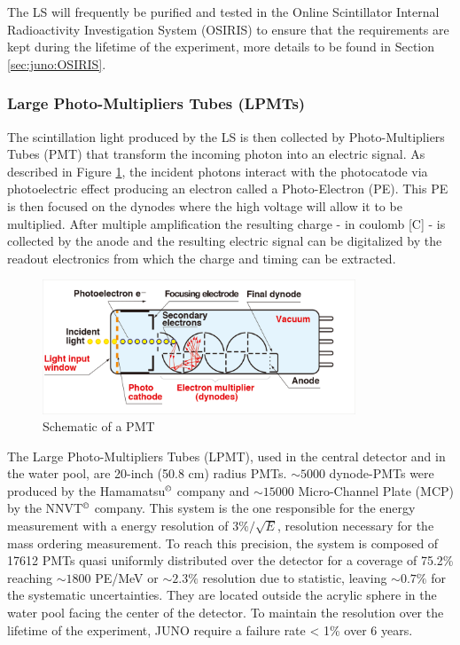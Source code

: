 \documentclass[../main.tex]{subfiles}
\begin{document}
The LS will frequently be purified and tested in the Online Scintillator Internal Radioactivity Investigation System (OSIRIS) \cite{juno_collaboration_design_2021} to ensure that the requirements are kept during the lifetime of the experiment, more details to be found in Section \ref{sec:juno:OSIRIS}.

\subsubsection{Large Photo-Multipliers Tubes (LPMTs)}
\label{sec:juno:LPMT}

The scintillation light produced by the LS is then collected by Photo-Multipliers Tubes (PMT) that transform the incoming photon into an electric signal. As described in Figure \ref{fig:juno:pmt-schem}, the incident photons interact with the photocatode via photoelectric effect producing an electron called a Photo-Electron (PE). This PE is then focused on the dynodes where the high voltage will allow it to be multiplied. After multiple amplification the resulting charge - in coulomb [C] - is collected by the anode and the resulting electric signal can be digitalized by the readout electronics from which the charge and timing can be extracted.

\begin{figure}[ht]
  \centering
  \includegraphics[height=4cm]{images/juno/pmt_schematic.png}
  \caption{Schematic of a PMT}
  \label{fig:juno:pmt-schem}
\end{figure}

The Large Photo-Multipliers Tubes (LPMT), used in the central detector and in the water pool, are 20-inch (50.8 cm) radius PMTs. $\sim 5000$ dynode-PMTs \cite{noauthor_photomultiplier_nodate} were produced by the Hamamatsu$^{\copyright}$ company and $\sim 15000$ Micro-Channel Plate (MCP) \cite{abusleme_mass_2022} by the NNVT$^{\copyright}$ company. This system is the one responsible for the energy measurement with a energy resolution of $3\%/\sqrt{E}$, resolution necessary for the mass ordering measurement. To reach this precision, the system is composed of 17612 PMTs quasi uniformly distributed over the detector for a coverage of 75.2\% reaching $\sim 1800$ PE/MeV or $\sim 2.3 \%$ resolution due to statistic, leaving $\sim 0.7\%$ for the systematic uncertainties. They are located outside the acrylic sphere in the water pool facing the center of the detector.
To maintain the resolution over the lifetime of the experiment, JUNO require a failure rate < 1\% over 6 years.
\end{document}
